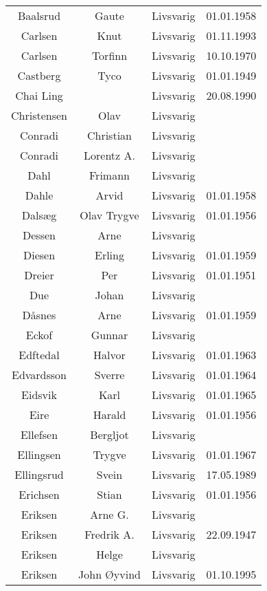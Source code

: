\begin{tabular}{cccc}
        Baalsrud	&	Gaute	&	Livsvarig 	&	01.01.1958	\\
        Carlsen	&	Knut	&	Livsvarig 	&	01.11.1993	\\
        Carlsen	&	Torfinn	&	Livsvarig 	&	10.10.1970	\\
        Castberg	&	Tyco	&	Livsvarig 	&	01.01.1949	\\
        Chai Ling	&		&	Livsvarig 	&	20.08.1990	\\
        Christensen	&	Olav	&	Livsvarig 	&		\\
        Conradi	&	Christian	&	Livsvarig 	&		\\
        Conradi	&	Lorentz A.	&	Livsvarig 	&		\\
        Dahl	&	Frimann	&	Livsvarig 	&		\\
        Dahle	&	Arvid	&	Livsvarig 	&	01.01.1958	\\
        Dalsæg	&	Olav Trygve	&	Livsvarig 	&	01.01.1956	\\
        Dessen	&	Arne	&	Livsvarig 	&		\\
        Diesen	&	Erling	&	Livsvarig 	&	01.01.1959	\\
        Dreier	&	Per	&	Livsvarig 	&	01.01.1951	\\
        Due	&	Johan	&	Livsvarig 	&		\\
        Dåsnes	&	Arne	&	Livsvarig 	&	01.01.1959	\\
        Eckof	&	Gunnar	&	Livsvarig 	&		\\
        Edftedal	&	Halvor	&	Livsvarig 	&	01.01.1963	\\
        Edvardsson	&	Sverre	&	Livsvarig 	&	01.01.1964	\\
        Eidsvik	&	Karl	&	Livsvarig 	&	01.01.1965	\\
        Eire	&	Harald	&	Livsvarig 	&	01.01.1956	\\
        Ellefsen	&	Bergljot	&	Livsvarig 	&		\\
        Ellingsen	&	Trygve	&	Livsvarig 	&	01.01.1967	\\
        Ellingsrud	&	Svein	&	Livsvarig 	&	17.05.1989	\\
        Erichsen	&	Stian	&	Livsvarig 	&	01.01.1956	\\
        Eriksen	&	Arne G.	&	Livsvarig 	&		\\
        Eriksen	&	Fredrik A.	&	Livsvarig 	&	22.09.1947	\\
        Eriksen	&	Helge	&	Livsvarig 	&		\\
        Eriksen 	&	John Øyvind	&	Livsvarig	&	01.10.1995	\\

\end{tabular}
